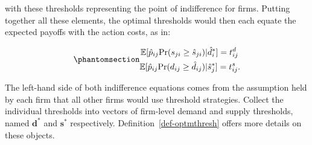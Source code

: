 \documentclass[
]{article}
\theoremstyle{definition}
\theoremstyle{plain}
\theoremstyle{remark}
\begin{document}
with these thresholds representing the point of indifference for firms.
Putting together all these elements, the optimal thresholds would then
each equate the expected payoffs with the action costs, as in:

\begin{equation}\phantomsection\label{eq-indif}{
\begin{split}
\mathbb{E}[\hat{p}_{ij} \text{Pr}(s_{ji} \geq \hat{s}_{ji}) &| \hat{d}_{i}^*] = t_{ij}^d \\
\mathbb{E}[\hat{p}_{ij} \text{Pr}(d_{ij} \geq \hat{d}_{ij}) &| \hat{s}_{j}^*] = t_{ij}^s.
\end{split}
}\end{equation}

The left-hand side of both indifference equations comes from the
assumption held by each firm that all other firms would use threshold
strategies. Collect the individual thresholds into vectors of firm-level
demand and supply thresholds, named \(\mathbf{d}^*\) and
\(\mathbf{s}^*\) respectively. Definition~\ref{def-optmthresh} offers
more details on these objects.
\end{document}

